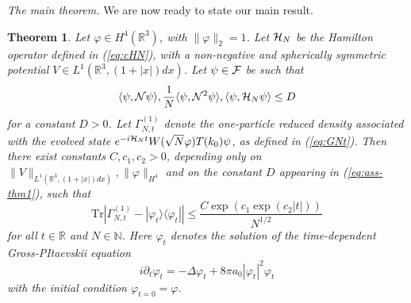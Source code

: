 \documentclass[11pt,a4paper]{article}
\newtheorem{thm}{Theorem}[section]  %
\newcommand{\bR}{{\mathbb R}}
\newcommand{\bN}{{\mathbb N}}
\newcommand{\tr}{\mbox{Tr}}
\newcommand{\cF}{{\cal F}}
\newcommand{\cH}{{\cal H}}
\newcommand{\cN}{{\cal N}}
\begin{document}
\bigskip

{\it The main theorem.} We are now ready to state our main result. 
\begin{thm}\label{thm:main}
Let $\varphi \in H^4 (\bR^3)$, with $\| \varphi \|_2 =1$. Let $\cH_N$ be the Hamilton operator defined in (\ref{eq:cHN}), with a non-negative and spherically symmetric potential $V \in L^1 (\bR^3, (1+|x|) dx)$. Let $\psi \in \cF$ be such that
\begin{equation}\label{eq:ass-thm1} \langle \psi , \cN \psi \rangle ,  \frac{1}{N} \langle \psi , \cN^2 \psi \rangle, \langle \psi, \cH_N \psi \rangle \leq D \end{equation}
for a constant $D>0$. Let $\Gamma_{N,t}^{(1)}$ denote the one-particle reduced density associated with the evolved state $e^{-i\cH_N t} W(\sqrt{N} \varphi) T(k_0) \psi$, as defined in (\ref{eq:GNt}). Then there exist constants $C, c_1, c_2 >0$, depending only on $\| V \|_{L^1 (\bR^3, (1+|x|) dx)}, \| \varphi \|_{H^4}$ and on the constant $D$ appearing in (\ref{eq:ass-thm1}), such that
\begin{equation}\label{eq:mt} \tr \left| \Gamma_{N,t}^{(1)} - |\varphi_t\rangle \langle \varphi_t| \right| \leq \frac{C \exp (c_1 \exp (c_2 |t|))}{N^{1/2}} \end{equation}
for all $t \in \bR$ and $N \in \bN$. Here $\varphi_t$ denotes the solution of the time-dependent Gross-PItaevskii equation
\begin{equation}\label{eq:GP} i\partial_t \varphi_t = -\Delta \varphi_t + 8 \pi a_0 |\varphi_t|^2 \varphi_t \end{equation}
with the initial condition $\varphi_{t=0} =\varphi$.
\end{thm}
\end{document}
